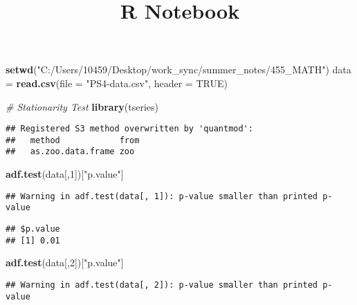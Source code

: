\documentclass[
]{article}
\title{R Notebook}
\author{}
\date{\vspace{-2.5em}}
\newenvironment{Shaded}{\begin{snugshade}}{\end{snugshade}}
\newcommand{\CommentTok}[1]{\textcolor[rgb]{0.56,0.35,0.01}{\textit{#1}}}
\newcommand{\DataTypeTok}[1]{\textcolor[rgb]{0.13,0.29,0.53}{#1}}
\newcommand{\DecValTok}[1]{\textcolor[rgb]{0.00,0.00,0.81}{#1}}
\newcommand{\KeywordTok}[1]{\textcolor[rgb]{0.13,0.29,0.53}{\textbf{#1}}}
\newcommand{\NormalTok}[1]{#1}
\newcommand{\OtherTok}[1]{\textcolor[rgb]{0.56,0.35,0.01}{#1}}
\newcommand{\StringTok}[1]{\textcolor[rgb]{0.31,0.60,0.02}{#1}}
\begin{document}
\maketitle

\begin{Shaded}
\begin{Highlighting}[]
\KeywordTok{setwd}\NormalTok{(}\StringTok{"C:/Users/10459/Desktop/work_sync/summer_notes/455_MATH"}\NormalTok{)}
\NormalTok{data =}\StringTok{ }\KeywordTok{read.csv}\NormalTok{(}\DataTypeTok{file =} \StringTok{"PS4-data.csv"}\NormalTok{, }\DataTypeTok{header =} \OtherTok{TRUE}\NormalTok{)}
\end{Highlighting}
\end{Shaded}

\begin{Shaded}
\begin{Highlighting}[]
\CommentTok{# Stationarity Test}
\KeywordTok{library}\NormalTok{(tseries)}
\end{Highlighting}
\end{Shaded}

\begin{verbatim}
## Registered S3 method overwritten by 'quantmod':
##   method            from
##   as.zoo.data.frame zoo
\end{verbatim}

\begin{Shaded}
\begin{Highlighting}[]
\KeywordTok{adf.test}\NormalTok{(data[,}\DecValTok{1}\NormalTok{])[}\StringTok{"p.value"}\NormalTok{]}
\end{Highlighting}
\end{Shaded}

\begin{verbatim}
## Warning in adf.test(data[, 1]): p-value smaller than printed p-value
\end{verbatim}

\begin{verbatim}
## $p.value
## [1] 0.01
\end{verbatim}

\begin{Shaded}
\begin{Highlighting}[]
\KeywordTok{adf.test}\NormalTok{(data[,}\DecValTok{2}\NormalTok{])[}\StringTok{"p.value"}\NormalTok{]}
\end{Highlighting}
\end{Shaded}

\begin{verbatim}
## Warning in adf.test(data[, 2]): p-value smaller than printed p-value
\end{verbatim}
\end{document}
